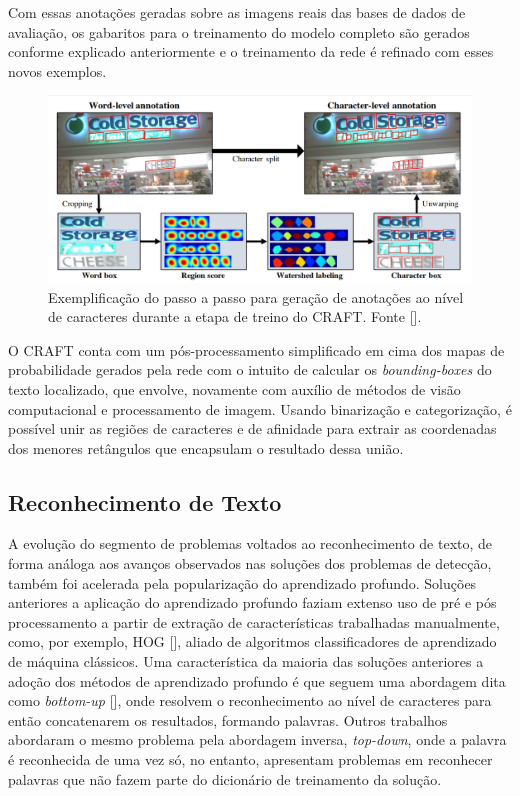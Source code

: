 Com essas anotações geradas sobre as imagens reais das bases de dados de avaliação, os gabaritos para o treinamento do modelo completo são gerados 
conforme explicado anteriormente e o treinamento da rede é refinado com esses novos exemplos.

\begin{figure}
    \centering
    \includegraphics[width=\textwidth]{figs/craft-char-level-annotation.png}
    \caption{Exemplificação do passo a passo para geração de anotações ao nível de caracteres durante a etapa de treino do CRAFT. Fonte [].}
    \label{fig:craft_char_level_annotation}
\end{figure}

O CRAFT conta com um pós-processamento simplificado em cima dos mapas de probabilidade gerados pela rede com o intuito de calcular os 
\textit{bounding-boxes} do texto localizado, que envolve, novamente com auxílio de métodos de visão computacional e processamento de imagem. Usando 
binarização e categorização, é possível unir as regiões de caracteres e de afinidade para extrair as coordenadas dos menores retângulos que 
encapsulam o resultado dessa união.


\subsection{Reconhecimento de Texto}
A evolução do segmento de problemas voltados ao reconhecimento de texto, de forma análoga aos avanços observados nas soluções dos problemas de 
detecção, também foi acelerada pela popularização do aprendizado profundo. Soluções anteriores a aplicação do aprendizado profundo faziam 
extenso uso de pré e pós processamento a partir de extração de características trabalhadas manualmente, como, por exemplo, HOG [], 
aliado de algoritmos classificadores de aprendizado de máquina clássicos. Uma característica da maioria das soluções anteriores a adoção dos métodos 
de aprendizado profundo é que seguem uma abordagem dita como \textit{bottom-up} [], onde resolvem o reconhecimento ao nível 
de caracteres para então concatenarem os resultados, formando palavras. Outros trabalhos abordaram o mesmo problema pela abordagem inversa, \textit{top-down}, 
onde a palavra é reconhecida de uma vez só, no entanto, apresentam problemas em reconhecer palavras que não fazem parte do dicionário de treinamento da solução.

